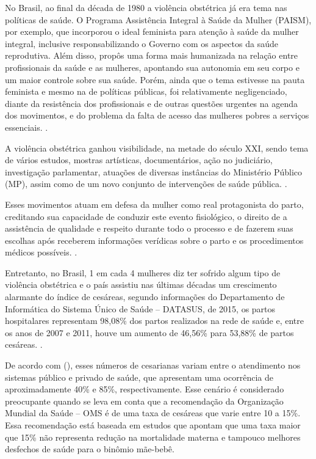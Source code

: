 No Brasil, ao final da década de 1980 a violência obstétrica já era tema nas políticas de saúde. O Programa Assistência Integral à Saúde da Mulher (\acrshort{PAISM}), por exemplo, que incorporou o ideal feminista para atenção à saúde da mulher integral, inclusive responsabilizando o Governo com os aspectos da saúde reprodutiva. Além disso, propôs uma forma mais humanizada na relação entre profissionais da saúde e as mulheres, apontando sua autonomia em seu corpo e um maior controle sobre sua saúde. Porém, ainda que o tema estivesse na pauta feminista e mesmo na de políticas públicas, foi relativamente negligenciado, diante da resistência dos profissionais e de outras questões urgentes na agenda dos movimentos, e do problema da falta de acesso das mulheres pobres a serviços essenciais. \cite{diniz2015abuse}.

A violência obstétrica ganhou visibilidade, na metade do século XXI, sendo tema de vários estudos, mostras artísticas, documentários, ação no judiciário, investigação parlamentar, atuações de diversas instâncias do Ministério Público (\acrshort{MP}), assim como de um novo conjunto de intervenções de saúde pública. \cite{diniz2015abuse}.

Esses movimentos atuam em defesa da mulher como real protagonista do parto, creditando sua capacidade de conduzir este evento fisiológico, o direito de a assistência de qualidade e respeito durante todo o processo e de fazerem suas escolhas após receberem informações verídicas sobre o parto e os procedimentos médicos possíveis. \cite{soares2017violencia}.

Entretanto, no Brasil, 1 em cada 4 mulheres diz ter sofrido algum tipo de violência obstétrica e o país assistiu nas últimas décadas um crescimento alarmante do índice de cesáreas, segundo informações do Departamento de Informática do Sistema Único de Saúde – \acrshort{DATASUS}, de 2015, os partos hospitalares representam 98,08\% dos partos realizados na rede de saúde e, entre os anos de 2007 e 2011, houve um aumento de 46,56\% para 53,88\% de partos cesáreas. \cite{soares2017violencia,zanardo2017violencia}.

De acordo com \citeauthor{zanardo2017violencia} (\citeyear{zanardo2017violencia}), esses números de cesarianas variam entre o atendimento nos sistemas público e privado de saúde, que apresentam uma ocorrência de aproximadamente 40\% e 85\%, respectivamente. Esse cenário é considerado preocupante quando se leva em conta que a recomendação da Organização Mundial da Saúde – \acrshort{OMS} \cite{world1996world} é de uma taxa de cesáreas que varie entre 10 a 15\%. Essa recomendação está baseada em estudos que apontam que uma taxa maior que 15\% não representa redução na mortalidade materna e tampouco melhores desfechos de saúde para o binômio mãe-bebê. 


